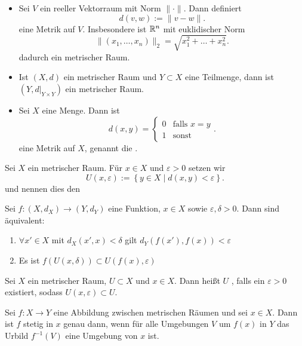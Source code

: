 \begin{example}
    \begin{itemize}
        \item 
    Sei $V$ ein reeller Vektorraum mit Norm  $\lVert \cdot  \rVert$. Dann definiert
    \[
        d(v,w) := \lVert v-w \rVert 
    .\] 
    eine Metrik auf $V$. Insbesondere ist $\mathbb{R}^n$ mit euklidischer Norm
    \[
        \lVert (x_1,\ldots,x_n) \rVert _2 = \sqrt{x_1^2 + \ldots + x_{n}^2} 
    .\] 
    dadurch ein metrischer Raum.
\item Ist $(X,d)$ ein metrischer Raum und  $Y\subset X$ eine Teilmenge, dann ist $(Y, d| _{Y\times Y})$ ein metrischer Raum.
\item Sei $X$ eine Menge. Dann ist
    \[
        d(x,y) = \begin{cases}
            0 & \text{falls } x=y \\
            1 & \text{sonst}
        \end{cases}
    .\] 
    eine Metrik auf $X$, genannt die .
    \end{itemize}
\end{example}
\begin{notation*}
    Sei $X$ ein metrischer Raum. Für  $x\in X$ und $ε>0$ setzen wir
     \[
         U(x,ε) := \left \{y\in X \mid  d(x,y) < ε\right\} 
    .\] 
    und nennen dies den 
\end{notation*}
\begin{observe}
    Sei $f: (X,d_X) \to  (Y,d_Y)$ eine Funktion, $x\in X$ sowie $ε,δ>0$. Dann sind äquivalent:
\begin{enumerate}[1)]
    \item $\forall x' \in X$ mit $d_X(x',x) < δ$ gilt  $d_Y(f(x'),f(x)) < ε$
    \item Es ist $f(U(x,\delta)) \subset U(f(x),ε)$
    \end{enumerate}
\end{observe}
\begin{definition}[Umgebung]\label{def:umgebung-metrischer-raum}
    Sei $X$ ein metrischer Raum,  $U\subset X$ und $x\in X$. Dann heißt $U$ , falls ein $ε>0$ existiert, sodass  $U(x,ε) \subset U$. 
\end{definition}
\begin{theorem}\label{thm:stetig-gdw-urbild-von-umgebung-ist-umgebung}
    Sei $f:X \to  Y$ eine Abbildung zwischen metrischen Räumen und sei $x\in X$. Dann ist $f$ stetig in  $x$ genau dann, wenn für alle Umgebungen  $V$ um  $f(x)$ in  $Y$ das Urbild  $f^{-1}(V)$ eine Umgebung von $x$ ist.
\end{theorem}

